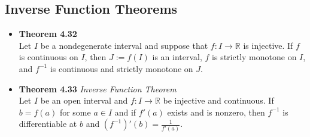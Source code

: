 \documentclass[11pt,a4paper]{article}
\begin{document}
\subsection{Inverse Function Theorems}

\begin{itemize}

    \item \textbf{Theorem 4.32} \\
        Let $I$ be a nondegenerate interval and suppose that $f : I \to \mathbb{R}$ is
        injective.
        If $f$ is continuous on $I$, then $J := f(I)$ is an interval, $f$ is strictly
        monotone on $I$, and $f^{-1}$ is continuous and strictly monotone on $J$.

    \item \textbf{Theorem 4.33} \emph{Inverse Function Theorem} \\
        Let $I$ be an open interval and $f : I \to \mathbb{R}$ be injective and continuous.
        If $b = f(a)$ for some $a \in I$ and if $f'(a)$ exists and is nonzero,
        then $f^{-1}$ is differentiable at $b$ and $(f^{-1})'(b) = \frac{1}{f'(a)}$.
\end{itemize}

\break{}



\end{document}
